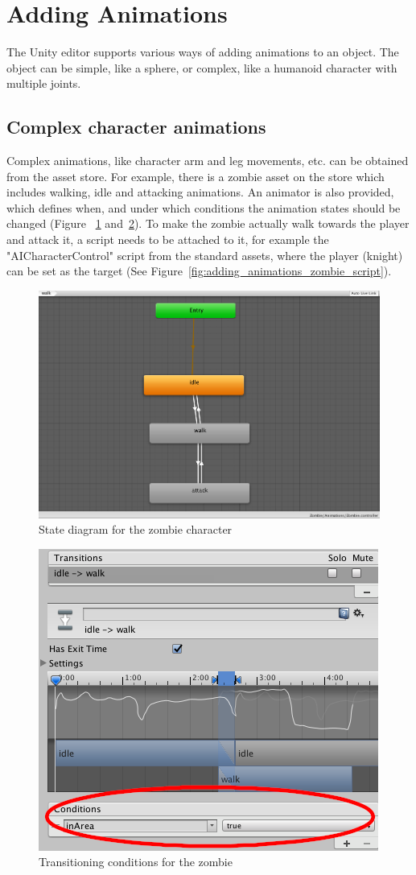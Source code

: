 \documentclass[12pt, a4paper, titlepage]{article}
\begin{document}
\section{Adding Animations}

The Unity editor supports various ways of adding animations to an object. The object can be simple, like a sphere, or complex, like a humanoid character with multiple joints. 


\subsection{Complex character animations}

Complex animations, like character arm and leg movements, etc. can be obtained from the asset store. For example, there is a zombie asset on the store which includes walking, idle and attacking animations. An animator is also provided, which defines when, and under which conditions the animation states should be changed (Figure ~\ref{fig:adding_animations_zombie_states} and~\ref{fig:adding_animations_zombie_transition}).  To make the zombie actually walk towards the player and attack it, a script needs to be attached to it, for example the "AICharacterControl" script from the standard assets, where the player (knight) can be set as the target (See Figure~\ref{fig:adding_animations_zombie_script}).

\begin{figure}[htbp]
  \centering
  \includegraphics[width=.4\textwidth]{pictures/zombie_states}
  \caption{State diagram for the zombie character}
  \label{fig:adding_animations_zombie_states}
\end{figure}

\begin{figure}[htbp]
  \centering
  \includegraphics[width=.4\textwidth]{pictures/zombie_transition}
  \caption{Transitioning conditions for the zombie}
  \label{fig:adding_animations_zombie_transition}
\end{figure}
\end{document}
